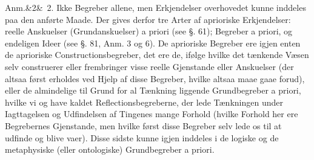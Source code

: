 \documentclass[12pt]{book}
\def\sperr#1{#1}%
\def\textit#1{#1}%
\def\emph#1{#1}%
\newcommand{\sperr}[1]{\textls[180]{#1}}
\newcommand{\anm}[1]{%
  \par\vspace{0.5\baselineskip}%
  \noindent\hspace{\parindent}\sperr{Anm.}\ifx&#1&\else~\textit{#1}.\fi
  \enspace\ignorespaces
}
\newcommand{\opage}[1]{\marginnote{\footnotesize\textit{[#1]}}}
\begin{document}
\anm{2} Ikke Begreber allene, men Erkjendelser overhovedet kunne inddeles paa den
anførte Maade. Der gives derfor tre Arter af \emph{aprioriske} Erkjendelser:
\emph{reelle Anskuelser} (\emph{Grundanskuelser}) \textit{a priori} (see §. 61);
Begreber \textit{a priori}, og endeligen Ideer (see §. 81, Anm. 3 og 6). De aprioriske
Begreber ere igjen enten de \emph{aprioriske Constructionsbegreber}, det ere de, ifølge
hvilke det tænkende Væsen selv construerer eller frembringer visse reelle Gjenstande
eller Anskuelser (der altsaa først erholdes ved Hjelp af disse Begreber, hvilke altsaa
maae gaae forud), eller de almindelige til Grund for al Tænkning liggende
Grundbegreber \textit{a priori}, hvilke vi og have kaldet \emph{Reflectionsbegreberne},
der lede Tænkningen under Iagttagelsen og Udfindelsen af Tingenes mange Forhold (hvilke
Forhold her ere Begrebernes Gjenstande, men hvilke
\opage{238}først disse Begreber selv lede os til at udfinde og blive vaer). Disse sidste kunne
igjen inddeles i de \emph{logiske} og de \emph{metaphysiske} (eller
\emph{ontologiske}) Grundbegreber \textit{a priori}.
\end{document}
